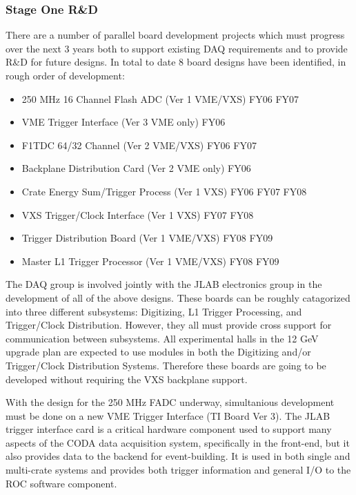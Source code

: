 \documentclass[10pt]{article}
\begin{document}
\subsubsection*{Stage One R\&D}

There are a number of parallel board development projects which must progress over the next 3
years both to support existing DAQ requirements and to provide R\&D for future designs.
In total to date 8 board designs have been identified, in rough order of development:
\begin{itemize}
\item 250 MHz 16 Channel Flash ADC (Ver 1 VME/VXS)  FY06 FY07
\item VME Trigger Interface (Ver 3 VME only)        FY06
\item F1TDC 64/32 Channel (Ver 2 VME/VXS)           FY06 FY07
\item Backplane Distribution Card (Ver 2 VME only)  FY06
\item Crate Energy Sum/Trigger Process (Ver 1 VXS)  FY06 FY07 FY08
\item VXS Trigger/Clock Interface (Ver 1 VXS)       FY07 FY08
\item Trigger Distribution Board (Ver 1 VME/VXS)    FY08 FY09
\item Master L1 Trigger Processor (Ver 1 VME/VXS)   FY08 FY09
\end{itemize}

The DAQ group is involved jointly with the JLAB electronics group in the 
development of all of the above designs. These boards can be roughly catagorized into
three different subsystems: Digitizing, L1 Trigger Processing, and Trigger/Clock Distribution.
However, they all must provide cross support for communication between subsystems.
All experimental halls in the 12 GeV upgrade plan are expected to use modules in both
the Digitizing and/or Trigger/Clock Distribution Systems. Therefore these boards are going
to be developed without requiring the VXS backplane support.

With the design for the 250 MHz FADC underway, simultanious development must be done on
a new VME Trigger Interface (TI Board Ver 3). The JLAB trigger interface card is a 
critical hardware component used to support many aspects of the CODA data 
acquisition system, specifically in the front-end, but it also provides data 
to the backend for event-building. It is used in both single and multi-crate systems 
and provides both trigger information and general I/O to the ROC software component.
\end{document}
